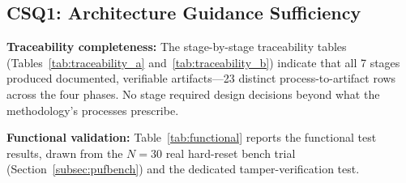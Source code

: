 \documentclass[preprint,12pt,authoryear]{elsarticle}
\begin{document}
\subsection{CSQ1: Architecture Guidance Sufficiency}

\textbf{Traceability completeness:} The stage-by-stage traceability tables (Tables~\ref{tab:traceability_a} and~\ref{tab:traceability_b}) indicate that all 7 stages produced documented, verifiable artifacts---23 distinct process-to-artifact rows across the four phases. No stage required design decisions beyond what the methodology's processes prescribe.

\textbf{Functional validation:} Table~\ref{tab:functional} reports the functional test results, drawn from the $N=30$ real hard-reset bench trial (Section~\ref{subsec:pufbench}) and the dedicated tamper-verification test.
\end{document}
